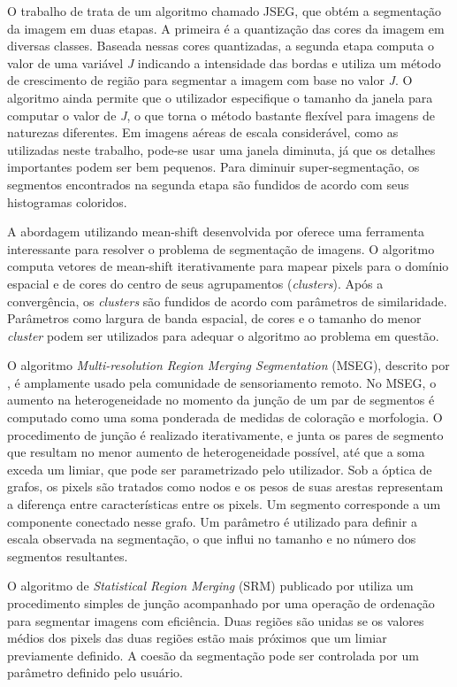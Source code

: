 O trabalho de  trata de um algoritmo chamado JSEG, que obtém a segmentação da imagem em duas etapas. A primeira é a  quantização das cores da imagem em diversas classes. Baseada nessas cores quantizadas, a segunda etapa computa o valor de uma variável \textit{J} indicando a intensidade das bordas e utiliza um método de crescimento de região para segmentar a imagem com base no valor \textit{J}. O algoritmo ainda permite que o utilizador especifique o tamanho da janela para computar o valor de \textit{J}, o que torna o método bastante flexível para imagens de naturezas diferentes. Em imagens aéreas de escala considerável, como as utilizadas neste trabalho, pode-se usar uma janela diminuta, já que os detalhes importantes podem ser bem pequenos. Para diminuir super-segmentação, os segmentos encontrados na segunda etapa são fundidos de acordo com seus histogramas coloridos.

A abordagem utilizando mean-shift desenvolvida por  oferece uma ferramenta interessante para resolver o problema de segmentação de imagens. O algoritmo computa vetores de mean-shift iterativamente para mapear pixels para o domínio espacial e de cores do centro de seus agrupamentos (\textit{clusters}). Após a convergência, os \textit{clusters} são fundidos de acordo com parâmetros de similaridade. Parâmetros como largura de banda espacial, de cores e o tamanho do menor \textit{cluster} podem ser utilizados para adequar o algoritmo ao problema em questão.

O algoritmo \textit{Multi-resolution Region Merging Segmentation} (MSEG), descrito por , é amplamente usado pela comunidade de sensoriamento remoto. No MSEG, o aumento na heterogeneidade no momento da junção de um par de segmentos é computado como uma soma ponderada de medidas de coloração e morfologia. O procedimento de junção é realizado iterativamente, e  junta os pares de segmento que resultam no menor aumento de heterogeneidade possível, até que a soma exceda um limiar, que pode ser parametrizado pelo utilizador. Sob a óptica de grafos, os pixels são tratados como nodos e os pesos de suas arestas representam a diferença entre características entre os pixels. Um segmento corresponde a um componente conectado nesse grafo. Um parâmetro é utilizado para definir a escala observada na segmentação, o que influi no tamanho e no número dos segmentos resultantes.

O algoritmo de \textit{Statistical Region Merging} (SRM) publicado por  utiliza um procedimento simples de junção acompanhado por uma operação de ordenação para segmentar imagens com eficiência. Duas regiões são unidas se os valores médios dos pixels das duas regiões estão mais próximos que um limiar previamente definido. A coesão da segmentação pode ser controlada por um parâmetro definido pelo usuário.

